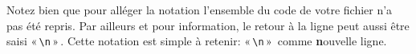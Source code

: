 Notez bien que pour alléger la notation l'ensemble du code de votre fichier n'a pas été repris. Par ailleurs et pour information, le retour à la ligne peut aussi être saisi « \Verb+\n+ » . Cette notation est simple à retenir: « \Verb+\n+ »  comme \textbf{n}ouvelle ligne.



\newpage
\thispagestyle{empty}
